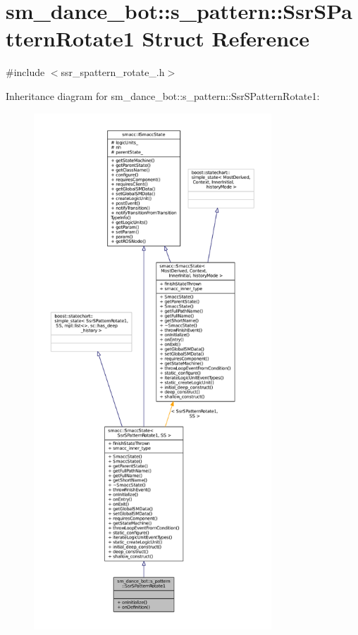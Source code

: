 \hypertarget{structsm__dance__bot_1_1s__pattern_1_1SsrSPatternRotate1}{}\section{sm\+\_\+dance\+\_\+bot\+:\+:s\+\_\+pattern\+:\+:Ssr\+S\+Pattern\+Rotate1 Struct Reference}
\label{structsm__dance__bot_1_1s__pattern_1_1SsrSPatternRotate1}


{\ttfamily \#include $<$ssr\+\_\+spattern\+\_\+rotate\+\_.\+h$>$}



Inheritance diagram for sm\+\_\+dance\+\_\+bot\+:\+:s\+\_\+pattern\+:\+:Ssr\+S\+Pattern\+Rotate1\+:
\nopagebreak
\begin{figure}[H]
\begin{center}
\leavevmode
\includegraphics[height=550pt]{structsm__dance__bot_1_1s__pattern_1_1SsrSPatternRotate1__inherit__graph}
\end{center}
\end{figure}



